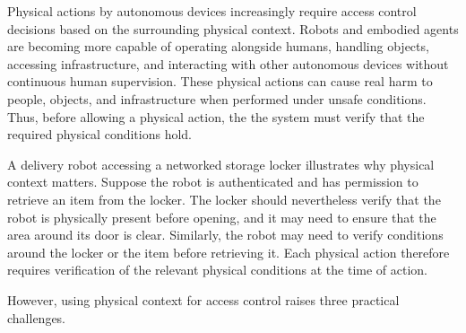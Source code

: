 \documentclass[sigconf,authordraft]{acmart}
\begin{document}








Physical actions by autonomous devices increasingly require access control decisions based on the surrounding physical context.
Robots and embodied agents are becoming more capable of operating alongside humans, handling objects, accessing infrastructure, and interacting with other autonomous devices without continuous human supervision.
These physical actions can cause real harm to people, objects, and infrastructure when performed under unsafe conditions.
Thus, before allowing a physical action, the the system must verify that the required physical conditions hold.

A delivery robot accessing a networked storage locker illustrates why physical context matters.
Suppose the robot is authenticated and has permission to retrieve an item from the locker.
The locker should nevertheless verify that the robot is physically present before opening, and it may need to ensure that the area around its door is clear.
Similarly, the robot may need to verify conditions around the locker or the item before retrieving it.
Each physical action therefore requires verification of the relevant physical conditions at the time of action.

However, using physical context for access control raises three practical challenges. 
\end{document}
